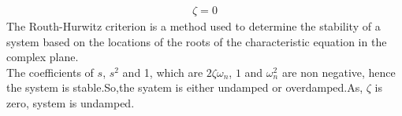 \documentclass[journal,12pt,onecolumn]{IEEEtran}
\theoremstyle{remark}
\begin{document}
    \begin{align}
    \zeta = 0
    \end{align}
    The Routh-Hurwitz criterion is a method used to determine the stability of a system based on the locations of the roots of the characteristic equation in the complex plane.\\
    
     The coefficients of $s$, $s^{2}$ and 1, which are $2\zeta \omega_{n}$, $1$ and $\omega_{n}^{2}$ are non negative, hence the system is stable.So,the syatem is either undamped or overdamped.As, 
    $\zeta$ is zero, system is undamped. 
\end{document}
